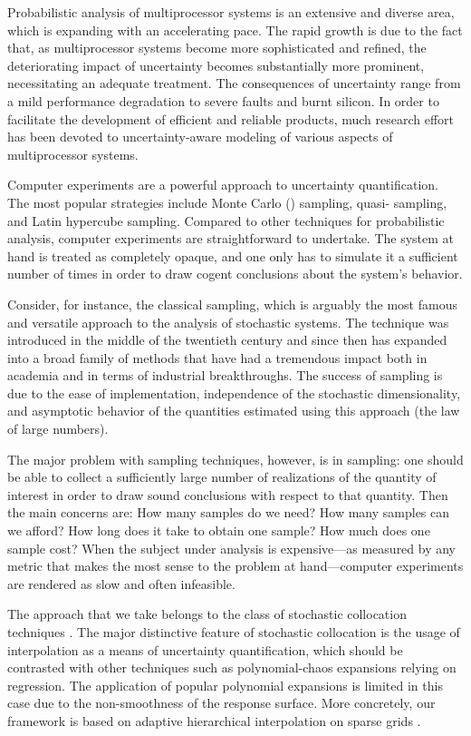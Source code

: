 Probabilistic analysis of multiprocessor systems is an extensive and diverse
area, which is expanding with an accelerating pace. The rapid growth is due to
the fact that, as multiprocessor systems become more sophisticated and refined,
the deteriorating impact of uncertainty becomes substantially more prominent,
necessitating an adequate treatment. The consequences of uncertainty range from
a mild performance degradation to severe faults and burnt silicon. In order to
facilitate the development of efficient and reliable products, much research
effort has been devoted to uncertainty-aware modeling of various aspects of
multiprocessor systems.

Computer experiments \cite{santner2003} are a powerful approach to uncertainty
quantification. The most popular strategies include Monte Carlo ()
sampling, quasi- sampling, and Latin hypercube sampling. Compared to
other techniques for probabilistic analysis, computer experiments are
straightforward to undertake. The system at hand is treated as completely
opaque, and one only has to simulate it a sufficient number of times in order to
draw cogent conclusions about the system's behavior.

Consider, for instance, the classical  sampling, which is arguably the
most famous and versatile approach to the analysis of stochastic systems. The
technique was introduced in the middle of the twentieth century and since then
has expanded into a broad family of methods that have had a tremendous impact
both in academia and in terms of industrial breakthroughs. The success of
 sampling is due to the ease of implementation, independence of the
stochastic dimensionality, and asymptotic behavior of the quantities estimated
using this approach (the law of large numbers).

The major problem with sampling techniques, however, is in sampling: one should
be able to collect a sufficiently large number of realizations of the quantity
of interest in order to draw sound conclusions with respect to that quantity.
Then the main concerns are: How many samples do we need? How many samples can we
afford? How long does it take to obtain one sample? How much does one sample
cost? When the subject under analysis is expensive---as measured by any metric
that makes the most sense to the problem at hand---computer experiments are
rendered as slow and often infeasible.

The approach that we take belongs to the class of stochastic collocation
techniques \cite{xiu2010}. The major distinctive feature of stochastic
collocation is the usage of interpolation as a means of uncertainty
quantification, which should be contrasted with other techniques such as
polynomial-chaos expansions relying on regression. The application of popular
polynomial expansions is limited in this case due to the non-smoothness of the
response surface. More concretely, our framework is based on adaptive
hierarchical interpolation on sparse grids \cite{klimke2006, ma2009}.

